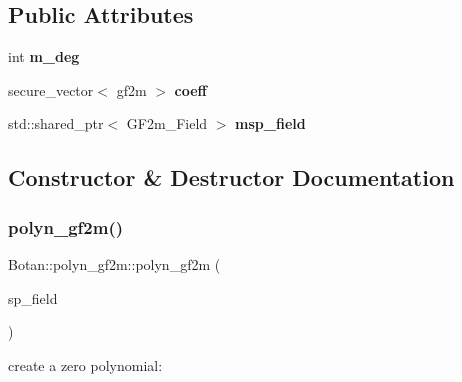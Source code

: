 \subsection*{Public Attributes}
\begin{DoxyCompactItemize}
\item 
\mbox{\label{class_botan_1_1polyn__gf2m_a1594e365b08693d7b92e00dd85503210}} 
int {\bfseries m\+\_\+deg}
\item 
\mbox{\label{class_botan_1_1polyn__gf2m_abdbc745672cea1211b4da685fad3c4cf}} 
secure\+\_\+vector$<$ gf2m $>$ {\bfseries coeff}
\item 
\mbox{\label{class_botan_1_1polyn__gf2m_a1b49fc3754b54131a894bc4dc288595d}} 
std\+::shared\+\_\+ptr$<$ G\+F2m\+\_\+\+Field $>$ {\bfseries msp\+\_\+field}
\end{DoxyCompactItemize}


\subsection{Constructor \& Destructor Documentation}
\mbox{\label{class_botan_1_1polyn__gf2m_ae99780249cace1fef68912738bd83497}} 
\subsubsection{\texorpdfstring{polyn\+\_\+gf2m()}{polyn\_gf2m()}\hspace{0.1cm}{\footnotesize\ttfamily [1/5]}}
{\footnotesize\ttfamily Botan\+::polyn\+\_\+gf2m\+::polyn\+\_\+gf2m (\begin{DoxyParamCaption}\item[{std\+::shared\+\_\+ptr$<$ G\+F2m\+\_\+\+Field $>$}]{sp\+\_\+field }\end{DoxyParamCaption})\hspace{0.3cm}{\ttfamily [explicit]}}

create a zero polynomial\+: \mbox{\label{class_botan_1_1polyn__gf2m_a689acdaa3af60106fac3c2ccb7edc0b7}} 
